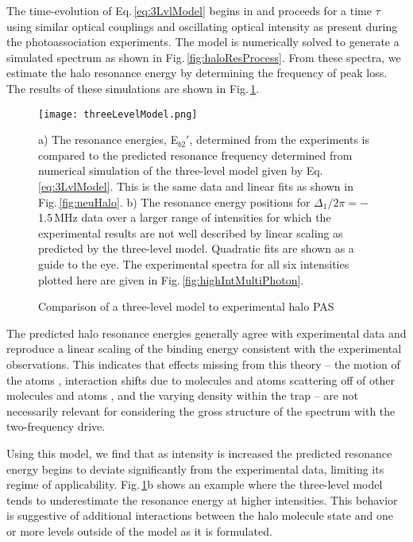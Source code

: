The time-evolution of Eq.\,\ref{eq:3LvlModel} begins in  and proceeds for a time $\tau$ using similar optical couplings and oscillating optical intensity as present during the photoassociation experiments.
The model is numerically solved to generate a simulated spectrum as shown in Fig.\,\ref{fig:haloResProcess}.
From these spectra, we estimate the halo resonance energy by determining the frequency of peak loss.
The results of these simulations are shown in Fig.\,\ref{fig:3LvlModel}.
	\begin{figure}
		\centerline{
		\texttt{[image: threeLevelModel.png]}}
		\caption{Comparison of a three-level model to experimental halo PAS}{a) The resonance energies, E$_{b2}'$, determined from the experiments is compared to the predicted resonance frequency determined from numerical simulation of the three-level model given by Eq.\,\ref{eq:3LvlModel}. This is the same data and linear fits as shown in Fig.\,\ref{fig:neuHalo}. b) The resonance energy positions for $\Delta_1/2 \pi = -$1.5\,MHz data over a larger range of intensities for which the experimental results are not well described by linear scaling as predicted by the three-level model. Quadratic fits are shown as a guide to the eye. The experimental spectra for all six intensities plotted here are given in Fig.\,\ref{fig:highIntMultiPhoton}.}
		\label{fig:3LvlModel}
	\end{figure} 
The predicted halo resonance energies generally agree with experimental data and reproduce a linear scaling of the binding energy consistent with the experimental observations.
This indicates that effects missing from this theory – the motion of the atoms \cite{Bohn1996,Bohn1999}, interaction shifts due to molecules and atoms scattering off of other molecules and atoms \cite{Wynar2000}, and the varying density within the trap \cite{MartinezDeEscobar2008} – are not necessarily relevant for considering the gross structure of the spectrum with the two-frequency drive.

Using this model, we find that as intensity is increased the predicted resonance energy begins to deviate significantly from the experimental data, limiting its regime of applicability.
Fig.\,\ref{fig:3LvlModel}b shows an example where the three-level model tends to underestimate the resonance energy at higher intensities.
This behavior is suggestive of additional interactions between the halo molecule state and one or more levels outside of the model as it is formulated.

